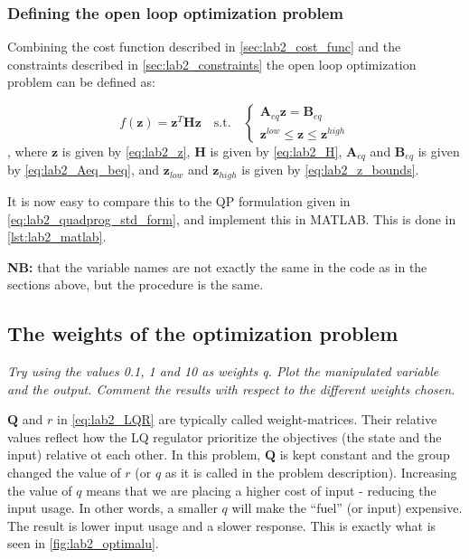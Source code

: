 \documentclass[../main.tex]{subfiles}
\begin{document}
\subsubsection{Defining the open loop optimization problem}
Combining the cost function described in \cref{sec:lab2_cost_func} and the constraints described in \cref{sec:lab2_constraints} the open loop optimization problem can be defined as: 

\begin{equation}\label{eq:lab2_open_loop_opt_problem}
	f(\bm z) = \bm z^T \bm  H \bm z \quad \text{s.t.} \quad 
	\begin{cases}
		\bm A_{eq} \bm z = \bm B_{eq} \\
		\bm z^{low} \leq \bm z \leq \bm z^{high}
	\end{cases} 
\end{equation}, 
where $ \bm z $ is given by \cref{eq:lab2_z}, $ \bm H $ is given by \cref{eq:lab2_H}, $ \bm A_{eq} $ and $ \bm B_{eq} $ is given by \cref{eq:lab2_Aeq_beq}, and $ \bm z_{low} $ and $ \bm z_{high} $ is given by \cref{eq:lab2_z_bounds}.

It is now easy to compare this to the QP formulation given in \cref{eq:lab2_quadprog_std_form}, and implement this in MATLAB. This is done in \cref{lst:lab2_matlab}. 

\textbf{NB:} that the variable names are not exactly the same in the code as in the sections above, but the procedure is the same.

\subsection{The weights of the optimization problem}
\textit{Try using the values 0.1, 1 and 10 as weights q. Plot the manipulated variable and the output. Comment the results with respect to the different weights chosen.}

$ \bm Q $ and $ r $ in \cref{eq:lab2_LQR} are typically called weight-matrices. Their relative values reflect how the LQ regulator prioritize the objectives (the state and the input) relative ot each other. In this problem, $ \bm Q $ is kept constant and the group changed the value of $ r $ (or $ q $ as it is called in the problem description). Increasing the value of $ q $ means that we are placing a higher cost of input - reducing the input usage. In other words, a smaller $ q $ will make the ``fuel'' (or input) expensive. 
The result is lower input usage and a slower response. This is exactly what is seen in \cref{fig:lab2_optimalu}.
\end{document}
